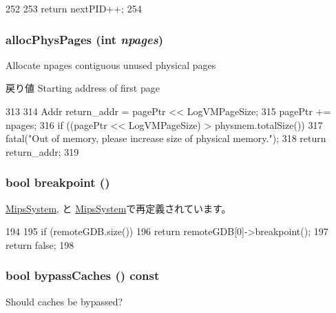 \begin{DoxyCode}
252     {
253         return nextPID++;
254     }
\end{DoxyCode}
\hypertarget{classSystem_ab816e894891a147b8ba762d89f46c902}{
\subsubsection[{allocPhysPages}]{ allocPhysPages (int {\em npages})}}
\label{classSystem_ab816e894891a147b8ba762d89f46c902}
Allocate npages contiguous unused physical pages \begin{DoxyReturn}{戻り値}
Starting address of first page 
\end{DoxyReturn}



\begin{DoxyCode}
313 {
314     Addr return_addr = pagePtr << LogVMPageSize;
315     pagePtr += npages;
316     if ((pagePtr << LogVMPageSize) > physmem.totalSize())
317         fatal("Out of memory, please increase size of physical memory.");
318     return return_addr;
319 }
\end{DoxyCode}
\hypertarget{classSystem_ae59ed2201db88c0668ca26040f6a3ad0}{
\subsubsection[{breakpoint}]{\setlength{\rightskip}{0pt plus 5cm}bool breakpoint ()}}
\label{classSystem_ae59ed2201db88c0668ca26040f6a3ad0}


\hyperlink{classMipsSystem_ae59ed2201db88c0668ca26040f6a3ad0}{MipsSystem}, と \hyperlink{classMipsSystem_aa9fdfc3926a9047bc0fb3d7b13030064}{MipsSystem}で再定義されています。


\begin{DoxyCode}
194 {
195     if (remoteGDB.size())
196         return remoteGDB[0]->breakpoint();
197     return false;
198 }
\end{DoxyCode}
\hypertarget{classSystem_a613d9d917b0e950cd322026de403d702}{
\subsubsection[{bypassCaches}]{\setlength{\rightskip}{0pt plus 5cm}bool bypassCaches () const}}
\label{classSystem_a613d9d917b0e950cd322026de403d702}
Should caches be bypassed?

